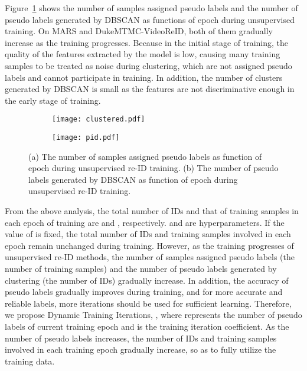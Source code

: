 \documentclass[10pt,twocolumn,letterpaper]{article}
\begin{document}
Figure~\ref{fig:pid-clustered} shows the number of samples assigned pseudo labels and the number of pseudo labels generated by DBSCAN as functions of epoch during unsupervised training. On MARS and DukeMTMC-VideoReID, both of them gradually increase as the training progresses. Because in the initial stage of training, the quality of the features extracted by the model is low, causing many training samples to be treated as noise during clustering, which are not assigned pseudo labels and cannot participate in training. In addition, the number of clusters generated by DBSCAN is small as the features are not discriminative enough in the early stage of training.

\begin{figure}
  \begin{subfigure}[t]{.23\textwidth}
    \centering
    \texttt{[image: clustered.pdf]}
    \caption{}
  \end{subfigure}
  \begin{subfigure}[t]{.23\textwidth}
    \centering
    \texttt{[image: pid.pdf]}
    \caption{}
  \end{subfigure}
  
  \caption{(a) The number of samples assigned pseudo labels as function of epoch during unsupervised re-ID training. (b) The number of pseudo labels generated by DBSCAN as function of epoch during unsupervised re-ID training.}
  \label{fig:pid-clustered}
\end{figure}

From the above analysis, the total number of IDs and that of training samples in each epoch of training are  and , respectively.  and  are hyperparameters. If the value of  is fixed, the total number of IDs and training samples involved in each epoch remain unchanged during training. However, as the training progresses of unsupervised re-ID methods, the number of samples assigned pseudo labels (the number of training samples) and the number of pseudo labels generated by clustering (the number of IDs) gradually increase. In addition, the accuracy of pseudo labels gradually improves during training, and for more accurate and reliable labels, more iterations should be used for sufficient learning. Therefore, we propose Dynamic Training Iterations, , where  represents the number of pseudo labels of current training epoch and  is the training iteration coefficient. As the number of pseudo labels increases, the number of IDs and training samples involved in each training epoch gradually increase, so as to fully utilize the training data.
\end{document}
